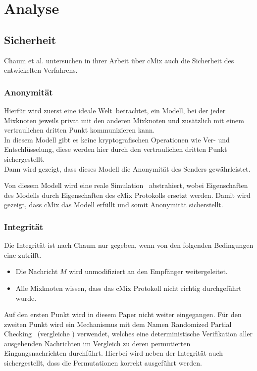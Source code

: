 \documentclass[
    fontsize=12pt,
    headings=small,
    parskip=half,           %
    bibliography=totoc,
    numbers=noenddot,       %
    open=any,               %
    final                   %
    ]{scrreprt}
\begin{document}
\section{Analyse}


\subsection{Sicherheit}

Chaum et al. untersuchen in ihrer Arbeit über cMix auch die Sicherheit des entwickelten Verfahrens.

\subsubsection{Anonymität}

Hierfür wird zuerst eine \glqq ideale Welt\grqq ~betrachtet, ein Modell, bei der jeder Mixknoten jeweils privat mit den anderen Mixknoten und zusätzlich mit einem vertraulichen dritten Punkt kommunizieren kann.\\
In diesem Modell gibt es keine kryptografischen Operationen wie Ver- und Entschlüsselung, diese werden hier durch den vertraulichen dritten Punkt sichergestellt.\\
Dann wird gezeigt, dass dieses Modell die Anonymität des Senders gewährleistet.

Von diesem Modell wird eine \glqq reale Simulation\grqq~ abstrahiert, wobei Eigenschaften des Modells durch Eigenschaften des cMix Protokolls ersetzt werden.
Damit wird gezeigt, dass cMix das Modell erfüllt und somit Anonymität sicherstellt.

\subsubsection{Integrität}

Die Integrität ist nach Chaum nur gegeben, wenn von den folgenden Bedingungen eine zutrifft.
\begin{itemize}
\item Die Nachricht $M$ wird unmodifiziert an den Empfänger weitergeleitet.
\item Alle Mixknoten wissen, dass das cMix Protokoll nicht richtig durchgeführt wurde.
\end{itemize}

Auf den ersten Punkt wird in diesem Paper nicht weiter eingegangen.
Für den zweiten Punkt wird ein Mechanismus mit dem Namen \glqq Randomized Partial Checking\grqq~ (vergleiche \cite{jakobsson2002making}) verwendet, welches eine deterministische Verifikation aller ausgehenden Nachrichten im Vergleich zu deren permutierten Eingangsnachrichten durchführt. 
Hierbei wird neben der Integrität auch sichergestellt, dass die Permutationen korrekt ausgeführt werden.
\end{document}
